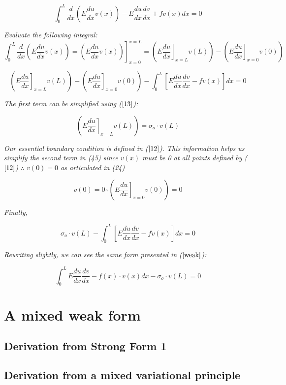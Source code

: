 \documentclass[12pt,american]{article}
\def\beq{\begin{equation}}
\def\eeq{\end{equation}}
\def \sigo{\sigma_{o}}
\begin{document}
\beq
\int_0^L \frac{d}{dx} \left( E \frac{du}{dx} v(x) \right) - E \frac{du}{dx} \frac{dv}{dx} + fv(x) dx = 0
\eeq

{\em Evaluate the following integral:}
\beq
\int_0^L \frac{d}{dx} \left( E \frac{du}{dx} v(x) \right) = \left. \left( E \frac{du}{dx} v(x) \right) \right]_{x=0}^{x=L} = 
\left( \left. E \frac{du}{dx} \right]_{x=L} v(L) \right) - 
\left( \left. E \frac{du}{dx} \right]_{x=0} v(0) \right)
\eeq

\beq
\left( \left. E \frac{du}{dx} \right]_{x=L} v(L) \right) - 
\left( \left. E \frac{du}{dx} \right]_{x=0} v(0) \right) - 
\int_0^L \left[ E \frac{du}{dx} \frac{dv}{dx} - fv(x) \right] dx = 0
\eeq

{\em The first term can be simplified using ($\ref{13}$):}

\beq
\left( \left. E \frac{du}{dx} \right]_{x=L} v(L) \right) = 
\sigo \cdot v(L)
\eeq

{\em Our essential boundary condition is defined in ($\ref{12}$). This information helps us simplify the second term in (45) since $v(x)$ must be 0 at all points defined by ($\ref{12}$) $\therefore$ $v(0) = 0$ as articulated in (24)}

\beq
v(0) = 0 \therefore \left( \left. E \frac{du}{dx} \right]_{x=0} v(0) \right) = 0
\eeq

{\em Finally,}

\beq
\sigo \cdot v(L) - \int_0^L \left[ E \frac{du}{dx} \frac{dv}{dx} - fv(x) \right] dx = 0
\eeq

{\em Rewriting slightly, we can see the same form presented in ($\ref{weak}$):}

\beq
\int_0^L E \frac{du}{dx} \frac{dv}{dx} - 
f(x) \cdot v(x) dx -
\sigo \cdot v(L) = 0
\eeq

\section{A mixed weak form}
\subsection{Derivation from Strong Form 1}
\subsection{Derivation from a mixed variational principle}
\end{document}
